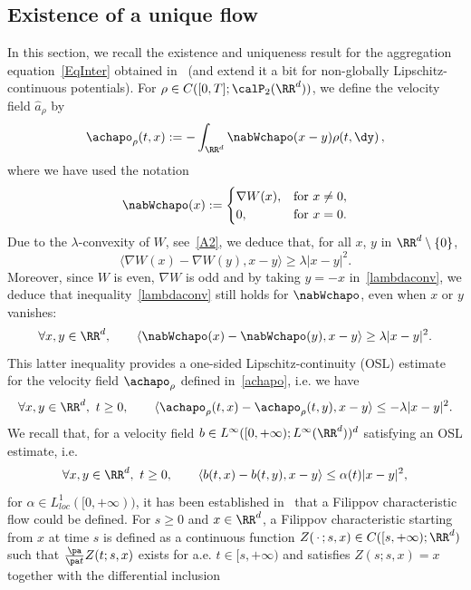 \subsection{Existence of a unique flow}

In this section, we recall the existence and uniqueness result for the aggregation equation~\eqref{EqInter} obtained in~\cite{CJLV} (and extend it a bit for non-globally Lipschitz-continuous potentials). For $\rho \in C([0,T];\calP_2(\RR^d))$, we define the velocity field $\widehat{a}_{\rho}$ by
\begin{equation}\label{achapo}
\achapo_{\rho}(t,x) := -\int_{\RR^d} \nabWchapo(x-y) \rho(t,\dy)\,,
\end{equation}
where we have used the notation
\[
\nabWchapo(x):=
\begin{cases} 
\nabla W(x), & \text{for } x\neq 0,\\
0, & \text{for } x=0.
\end{cases}
\]
Due to the $\lambda$-convexity of $W$, see~\eqref{A2}, we deduce that, for all $x$, $y$ in $\RR^d\setminus \{0\}$,
\begin{equation}\label{lambdaconv}
\langle \nabla W(x)-\nabla W(y), x-y\rangle \geq \lambda |x-y|^2.
\end{equation}
Moreover, since $W$ is even, $\nabla W$ is odd and by taking $y=-x$ in~\eqref{lambdaconv}, we deduce that inequality~\eqref{lambdaconv} still holds for $\nabWchapo$, even when $x$ or $y$ vanishes:
\begin{equation}\label{lambdaconvWchapo}
\forall x,y\in\RR^d, \qquad
\langle\nabWchapo(x)-\nabWchapo(y),x-y\rangle \geq \lambda |x-y|^2.
\end{equation}
This latter inequality provides a one-sided Lipschitz-continuity (OSL) estimate for the velocity field $\achapo_\rho$ defined in~\eqref{achapo}, i.e. we have
\begin{equation*}
\forall x,y\in\RR^d, \ t \geq 0, \qquad
\langle \achapo_{\rho}(t,x)-\achapo_{\rho}(t,y), x-y\rangle \leq -\lambda |x-y|^2.
\end{equation*}
We recall that, for a velocity field $b\in L^\infty([0,+\infty);L^\infty(\RR^d))^d$ satisfying an OSL estimate, i.e.
\[
\forall x,y\in \RR^d,\ t \geq 0, \qquad
\langle b(t,x)-b(t,y),x-y\rangle \leq \alpha(t) |x-y|^2,
\]
for $\alpha\in L^1_{loc}([0,+\infty))$, it has been established in~\cite{Filippov} that a Filippov characteristic flow could be defined. For $s\geq 0$ and $x\in \RR^d$, a Filippov characteristic starting from $x$ at time $s$ is defined as a continuous function $Z({\,\cdot\,};s,x)\in C([s,+\infty);\RR^d)$ such that $\frac{\pa}{\pa t}Z(t;s,x)$ exists for a.e. $t\in[s,+\infty)$ and satisfies $Z(s;s,x)=x$ together with the differential inclusion
